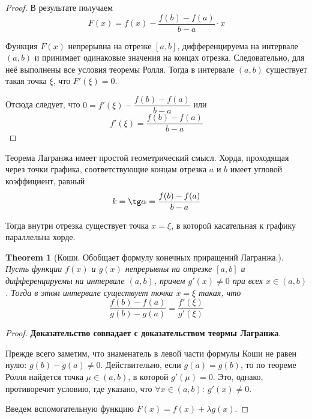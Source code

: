 \documentclass[a4paper]{article}
\theoremstyle{named}
\newtheorem*{namedtheorem}{Theorem}
\begin{document}
\begin{colloq}
\begin{proof}
			В результате получаем
			\begin{equation*}
				F(x) = f(x) - \dfrac{f(b) - f(a)}{b - a} \cdot x
			\end{equation*}

			Функция $F(x)$ непрерывна на отрезке $[a, b]$, дифференцируема на интервале $(a, b)$ и принимает одинаковые значения на концах отрезка. Следовательно, для неё выполнены все условия теоремы Ролля. Тогда в интервале $(a, b)$ существует такая точка $\xi$, что $F'(\xi) = 0$.

			Отсюда следует, что $0 = f'(\xi) - \dfrac{f(b) - f(a)}{b - a}$ или
			\begin{equation*}
				f'(\xi) = \dfrac{f(b) - f(a)}{b - a}
			\end{equation*}
		\end{proof}

		Теорема Лагранжа имеет простой геометрический смысл. Хорда, проходящая через точки графика, соответствующие концам отрезка $a$ и $b$ имеет угловой коэффициент, равный
		\begin{equation*}
			k = \tg \alpha = \dfrac{f(b) - f(a)}{b - a}
		\end{equation*}

		Тогда внутри отрезка существует точка $x = \xi$, в которой касательная к графику параллельна хорде.

		\begin{namedtheorem}[Коши. Обобщает формулу конечных приращений Лагранжа.]
			Пусть функции $f(x)$ и $g(x)$ непрерывны на отрезке $[a, b]$ и дифференцируемы на интервале $(a, b)$, причем $g'(x) \neq 0$ при всех $x \in (a, b)$. Тогда в этом интервале существует точка $x = \xi$ такая, что
			\begin{equation*}
				\dfrac{f(b) - f(a)}{g(b) - g(a)} = \dfrac{f'(\xi)}{g'(\xi)}
			\end{equation*}
		\end{namedtheorem}

		\begin{proof}
			\textbf{Доказательство совпадает с доказательством теормы Лагранжа}.


			Прежде всего заметим, что знаменатель в левой части формулы Коши не равен нулю: $g(b) - g(a) \neq 0$. Действительно, если $g(a) = g(b)$, то по теореме Ролля найдется точка $\mu \in (a, b)$, в которой $g'(\mu) = 0$. Это, однако, противоречит условию, где указано, что $\forall x \in (a, b): \ g'(x) \neq 0$.

			Введем вспомогательную функцию $F(x) = f(x) + \lambda g(x)$.


\end{proof}
\end{colloq}
\end{document}
